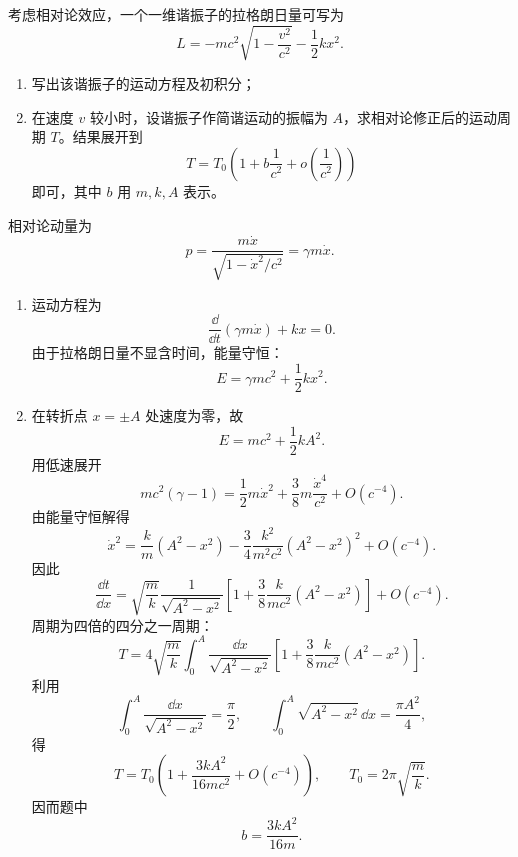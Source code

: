 \begin{question}[相对论谐振子]
考虑相对论效应，一个一维谐振子的拉格朗日量可写为
\[
  L=-mc^2\sqrt{1-\frac{v^2}{c^2}}-\frac12kx^2.
\]
\begin{enumerate}
  \item 写出该谐振子的运动方程及初积分；
  \item 在速度 $v$ 较小时，设谐振子作简谐运动的振幅为 $A$，求相对论修正后的运动周期 $T$。结果展开到
  \[
    T=T_0\left(1+b\frac{1}{c^2}+o\left(\frac{1}{c^2}\right)\right)
  \]
  即可，其中 $b$ 用 $m,k,A$ 表示。
\end{enumerate}

\begin{solution}
相对论动量为
\[
  p=\frac{m\dot x}{\sqrt{1-\dot x^2/c^2}}=\gamma m\dot x.
\]
\begin{enumerate}
  \item 运动方程为
  \[
    \frac{\dd}{\dd t}(\gamma m\dot x)+kx=0.
  \]
  由于拉格朗日量不显含时间，能量守恒：
  \[
    \boxed{E=\gamma mc^2+\frac12kx^2}.
  \]
  \item 在转折点 $x=\pm A$ 处速度为零，故
  \[
    E=mc^2+\frac12kA^2.
  \]
  用低速展开
  \[
    mc^2(\gamma-1)=\frac12m\dot x^2+\frac38m\frac{\dot x^4}{c^2}+O(c^{-4}).
  \]
  由能量守恒解得
  \[
    \dot x^2=\frac{k}{m}(A^2-x^2)
    -\frac34\frac{k^2}{m^2c^2}(A^2-x^2)^2+O(c^{-4}).
  \]
  因此
  \[
    \frac{\dd t}{\dd x}
    =\sqrt{\frac{m}{k}}\frac{1}{\sqrt{A^2-x^2}}
    \left[1+\frac38\frac{k}{mc^2}(A^2-x^2)\right]+O(c^{-4}).
  \]
  周期为四倍的四分之一周期：
  \[
    T=4\sqrt{\frac{m}{k}}\int_0^A
    \frac{\dd x}{\sqrt{A^2-x^2}}
    \left[1+\frac38\frac{k}{mc^2}(A^2-x^2)\right].
  \]
  利用
  \[
    \int_0^A\frac{\dd x}{\sqrt{A^2-x^2}}=\frac\pi2,
    \qquad
    \int_0^A\sqrt{A^2-x^2}\,\dd x=\frac{\pi A^2}{4},
  \]
  得
  \[
    \boxed{T=T_0\left(1+\frac{3kA^2}{16mc^2}+O(c^{-4})\right)},
    \qquad
    T_0=2\pi\sqrt{\frac mk}.
  \]
  因而题中
  \[
    \boxed{b=\frac{3kA^2}{16m}}.
  \]
\end{enumerate}
\end{solution}
\end{question}

